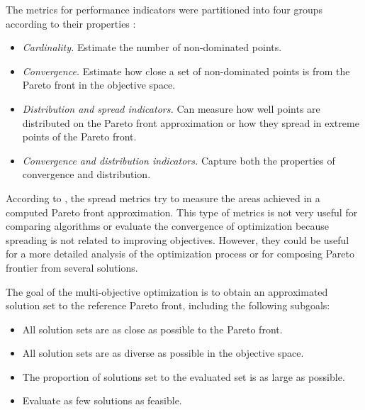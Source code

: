             The metrics for performance indicators were partitioned into four groups according to their properties \cite{Audet2018PerformanceII}: 
            \begin{itemize}
                \item \textit{Cardinality.} Estimate the number of non-dominated points.
                \item \textit{Convergence.} Estimate how close a set of non-dominated points is from the Pareto front in the objective space.
                \item \textit{Distribution and spread indicators.}  Can measure how well points are distributed on the Pareto front approximation or how they spread in extreme points of the Pareto front.
                \item \textit{Convergence and distribution indicators.} Capture both the properties of convergence and distribution.
            \end{itemize}

            According to \cite{CustodioMVV11}, the spread metrics try to measure the areas achieved in a computed Pareto front approximation. This type of metrics is not very useful for comparing algorithms or evaluate the convergence of optimization because spreading is not related to improving objectives. However, they could be useful for a more detailed analysis of the optimization process or for composing Pareto frontier from several solutions.

            The goal of the multi-objective optimization is to obtain an approximated solution set to the reference Pareto front, including the following subgoals:
            \begin{itemize}
                \item All solution sets are as close as possible to the Pareto front.
                \item All solution sets are as diverse as possible in the objective space.
                \item The proportion of solutions set to the evaluated set is as large as possible. 
                \item Evaluate as few solutions as feasible.
            \end{itemize}

